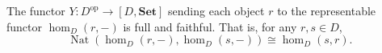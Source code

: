 The functor $Y: D^{\text{op}} \rightarrow [D, \mathbf{Set}]$ sending each object $r$ to the representable functor $\hom_D(r, -)$ is full and faithful. That is, for any $r, s \in D$,
\[
\operatorname{Nat}(\hom_D(r, -), \hom_D(s, -)) \cong \hom_D(s, r).
\]